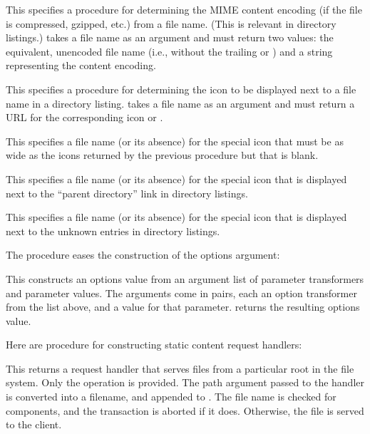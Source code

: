 \begin{desc}
  This specifies a procedure for determining the MIME content encoding
  (if the file is compressed, gzipped, etc.) from a file name.
  (This is relevant in directory listings.)  
   takes a file name as an argument and must return two
  values: the equivalent, unencoded file name (i.e., without the
  trailing  or ) and a string representing the content
  encoding.
\end{desc}

\begin{desc}
  This specifies a procedure for determining the icon to be displayed
  next to a file name in a directory listing.
   takes a file name as an argument and must return a URL
  for the corresponding icon or \sharpf.
\end{desc}

\begin{desc}
  This specifies a file name (or its absence) for the special icon
  that must be as wide as the icons returned by the previous procedure
  but that is blank.
\end{desc}

\begin{desc}
  This specifies a file name (or its absence) for the special icon
  that is displayed next to the ``parent directory'' link in directory
  listings.
\end{desc}

\begin{desc}
  This specifies a file name (or its absence) for the special icon
  that is displayed next to the unknown entries in directory listings.
\end{desc}

The  procedure eases the construction
of the options argument:

\begin{desc}
  This constructs an options value from an argument list of parameter
  transformers and parameter values.  The arguments come in pairs,
  each an option transformer from the list above, and a value for that
  parameter.   returns the resulting
  options value.
\end{desc}
%
Here are procedure for constructing static content request handlers:
%
\begin{desc}
  This returns a request handler that serves files from a particular
  root in the file system.  Only the  operation is provided.
  The path argument passed to the handler is converted into a
  filename, and appended to .  The file name is checked for
    components, and the transaction is aborted if it does.
  Otherwise, the file is served to the client.
\end{desc}

